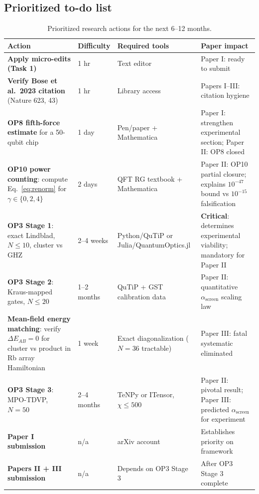 \documentclass[12pt,letterpaper]{article}
\theoremstyle{plain}
\theoremstyle{definition}
\newcommand{\asc}{\alpha_{\mathrm{screen}}}
\begin{document}
\subsection{Prioritized to-do list}

\begin{table}[h]
\centering\small
\caption{Prioritized research actions for the next 6--12 months.}
\label{tab:todo}
\begin{tabular}{@{}p{4.2cm}p{1.6cm}p{3cm}p{3.2cm}@{}}
\toprule
Action & Difficulty & Required tools & Paper impact \\
\midrule
\textbf{Apply micro-edits (Task 1)} & 1 hr & Text editor & Paper I: ready to submit \\
\addlinespace
\textbf{Verify Bose et al.\ 2023 citation} (Nature 623, 43) & 1 hr & Library access & Papers I--III: citation hygiene \\
\addlinespace
\textbf{OP8 fifth-force estimate} for a 50-qubit chip & 1 day & Pen/paper + Mathematica & Paper I: strengthen experimental section; Paper II: OP8 closed \\
\addlinespace
\textbf{OP10 power counting}: compute Eq.~\eqref{eq:renorm} for $\gamma \in \{0,2,4\}$ & 2 days & QFT RG textbook + Mathematica & Paper II: OP10 partial closure; explains $10^{-47}$ bound vs $10^{-15}$ falsification \\
\addlinespace
\textbf{OP3 Stage 1}: exact Lindblad, $N \leq 10$, cluster vs GHZ & 2--4 weeks & Python/QuTiP or Julia/QuantumOptics.jl & \textbf{Critical}: determines experimental viability; mandatory for Paper II \\
\addlinespace
\textbf{OP3 Stage 2}: Kraus-mapped gates, $N \leq 20$ & 1--2 months & QuTiP + GST calibration data & Paper II: quantitative $\asc$ scaling law \\
\addlinespace
\textbf{Mean-field energy matching}: verify $\Delta E_{AB} = 0$ for cluster vs product in Rb array Hamiltonian & 1 week & Exact diagonalization ($N=36$ tractable) & Paper III: fatal systematic eliminated \\
\addlinespace
\textbf{OP3 Stage 3}: MPO-TDVP, $N = 50$ & 2--4 months & TeNPy or ITensor, $\chi \leq 500$ & Paper II: pivotal result; Paper III: predicted $\asc$ for experiment \\
\addlinespace
\textbf{Paper I submission} & n/a & arXiv account & Establishes priority on framework \\
\addlinespace
\textbf{Papers II + III submission} & n/a & Depends on OP3 Stage 3 & After OP3 Stage 3 complete \\
\bottomrule
\end{tabular}
\end{table}
\end{document}
